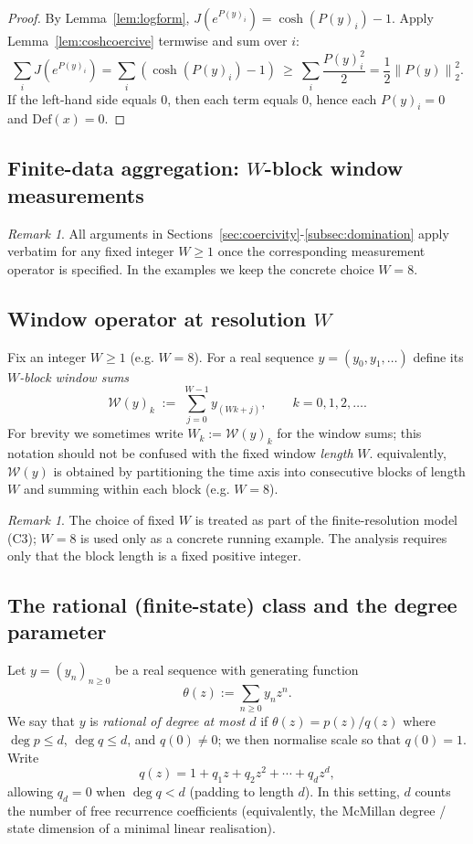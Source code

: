 \documentclass[11pt,reqno]{amsart}
\theoremstyle{definition}
\theoremstyle{remark}
\newtheorem{remark}[theorem]{Remark} %
\newcommand{\1}{\mathbf{1}}
\newcommand{\norm}[1]{\left\lVert #1 \right\rVert}
\begin{document}
\begin{proof}
By Lemma~\ref{lem:logform}, $J(e^{P(y)_i})=\cosh(P(y)_i)-1$.
Apply Lemma~\ref{lem:coshcoercive} termwise and sum over $i$:
\[
\sum_i J(e^{P(y)_i})=\sum_i(\cosh(P(y)_i)-1)\ \geq\ \sum_i \frac{P(y)_i^2}{2}
=\frac12 \norm{P(y)}_2^2.
\]
If the left-hand side equals $0$, then each term equals $0$, hence each $P(y)_i=0$ and $\mathrm{Def}(x)=0$.
\end{proof}

\subsection{\texorpdfstring{Finite-data aggregation: $W$-block window measurements}{Finite-data aggregation: W-block window measurements}}\label{sec:aggregation}

\begin{remark}\label{rem:Wparam}
All arguments in Sections~\ref{sec:coercivity}-\ref{subsec:domination} apply verbatim for any fixed
integer $W\geq 1$ once the corresponding measurement operator is specified.
In the examples we keep the concrete choice $W=8$.
\end{remark}

\subsection{\texorpdfstring{Window operator at resolution $W$}{Window operator at resolution W}}
Fix an integer $W\ge 1$ (e.g. $W=8$). For a real sequence $y=(y_0,y_1,\dots)$ define its \emph{$W$-block window sums}
\begin{equation}\label{eq:window}
\mathcal{W}(y)_k \;:=\; \sum_{j=0}^{W-1} y_{(Wk+j)},\qquad k=0,1,2,\dots.
\end{equation}
For brevity we sometimes write $W_k:=\mathcal W(y)_k$ for the window sums; this notation should not be confused with the fixed window \emph{length} $W$.
equivalently, $\mathcal{W}(y)$ is obtained by partitioning the time axis into consecutive blocks
of length $W$ and summing within each block (e.g. $W=8$).
\begin{remark}
The choice of fixed $W$ is treated as part of the finite-resolution model (C3); $W=8$ is used only as a concrete running example. The analysis requires only that the block length is a fixed positive integer.
\end{remark}

\subsection{The rational (finite-state) class and the degree parameter}
Let $y=(y_n)_{n\geq 0}$ be a real sequence with generating function
\[
\theta(z):=\sum_{n\geq 0} y_n z^n.
\]
We say that $y$ is \emph{rational of degree at most $d$} if $\theta(z)=p(z)/q(z)$ where
$\deg p\le d$, $\deg q\le d$, and $q(0)\neq 0$; we then normalise scale so that $q(0)=1$.
Write
\[
q(z)=1+q_1 z+q_2 z^2+\cdots+q_d z^d,
\]
allowing $q_d=0$ when $\deg q<d$ (padding to length $d$). In this setting, $d$ counts the number of
free recurrence coefficients (equivalently, the McMillan degree / state dimension of a minimal
linear realisation).
\end{document}
